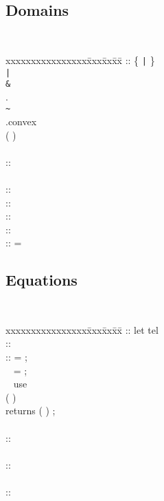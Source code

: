 \subsection{Domains}
{\tt
\begin{tabbing}
xxxxxxxxxxxxxxxx\= xxx\= xx\=  xx\= \kill
\Domain \>::\>\> \{ \IndexList \verb~|~ \ConstraintList \}\\
\>\>\Alt\> \Domain \verb~|~ \Domain\\
\>\>\Alt\> \Domain \verb~&~ \Domain\\
\>\>\Alt\> \Domain .\AffineFunction\\
\>\>\Alt\> \verb'~' \Domain\\
\>\>\Alt\> \Domain .convex\\
\>\>\Alt\> ( \Domain )\\
\\
\IndexList\>::\>\> \Opt{\IndexList ,} \Identifier\\
\\
\ConstraintList\>::\>\> \Opt{\ConstraintList ;} \Constraint\\
\Constraint \>::\>\> \IncreasingSeq \Alt\ \DecreasingSeq \Alt\ \EqualitySeq\\
\IncreasingSeq \>::\>\> \Group{ \IncreasingSeq \Alt\ \IndexExpList }
  \Group{ < \Alt\ <= } \IndexExpList\\
\DecreasingSeq \>::\>\> \Group{ \DecreasingSeq \Alt\ \IndexExpList }
  \Group{ > \Alt\ >= } \IndexExpList\\
\EqualitySeq\>::\>\> \Group{ \EqualitySeq \Alt\ \IndexExpList } = \IndexExpList
\end{tabbing}
}

\subsection{Equations}
{\tt
\begin{tabbing}
xxxxxxxxxxxxxxxx\= xxx\= xx\=  xx\= \kill
\EquationBlock \>::\>\> let \EquationList tel \\
\EquationList  \>::\>\> \Opt{ \EquationList } \Equation\\
\Equation\>::\>\> \Identifier [ \IndexList ] = \Expression ;\\
\>\> \Alt\ \> \Identifier = \Expression ;\\
\>\> \Alt\ \> use \Opt{ \ExtensionDomain} \Identifier
                                     \\
\>\>\>\>( \InputList )\\
\>\>\>\> returns ( \IdentifierList ) ;\\
\\
\ParamAssignation \>::\>\> \AffineFunction \\
\\
\InputList \>::\>\> \Opt{ \InputList , } \Expression\\
\\
\ExtensionDomain \>::\>\> \Domain \\
\end{tabbing}
}

